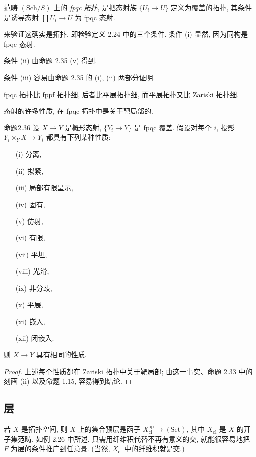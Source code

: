 范畴 $(\mathrm{Sch}/S)$ 上的 \emph{fpqc 拓扑}, 是把态射族 $\{U_i\to U\}$ 定义为覆盖的拓扑, 其条件是诱导态射 $\coprod U_i\to U$ 为 fpqc 态射.

来验证这确实是拓扑, 即检验定义 2.24 中的三个条件. 条件 (i) 显然, 因为同构是 fpqc 态射.

条件 (ii) 由命题 2.35 (v) 得到.

条件 (iii) 容易由命题 2.35 的 (i), (ii) 两部分证明.

fpqc 拓扑比 fppf 拓扑细, 后者比平展拓扑细, 而平展拓扑又比 Zariski 拓扑细.

态射的许多性质, 在 fpqc 拓扑中是关于靶局部的.

\begin{origstatement}{命题}{2.36}\label{ch02:prop236}
设 $X\to Y$ 是概形态射, $\{Y_i\to Y\}$ 是 fpqc 覆盖. 假设对每个 $i$, 投影 $Y_i\times_YX\to Y_i$ 都具有下列某种性质:
\begin{enumerate}
\item[(i)] 分离,
\item[(ii)] 拟紧,
\item[(iii)] 局部有限呈示,
\item[(iv)] 固有,
\item[(v)] 仿射,
\item[(vi)] 有限,
\item[(vii)] 平坦,
\item[(viii)] 光滑,
\item[(ix)] 非分歧,
\item[(x)] 平展,
\item[(xi)] 嵌入,
\item[(xii)] 闭嵌入.
\end{enumerate}
则 $X\to Y$ 具有相同的性质.
\end{origstatement}
\begin{proof}
上述每个性质都在 Zariski 拓扑中关于靶局部; 由这一事实、命题 2.33 中的刻画 (ii) 以及命题 1.15, 容易得到结论.
\end{proof}

\subsection{层}\label{ch02:sec233}
若 $X$ 是拓扑空间, 则 $X$ 上的集合预层是函子 $X_{\mathrm{cl}}^{\mathrm{op}}\to(\mathrm{Set})$, 其中 $X_{\mathrm{cl}}$ 是 $X$ 的开子集范畴, 如例 2.26 中所述. 只需用纤维积代替不再有意义的交, 就能很容易地把 $F$ 为层的条件推广到任意景. (当然, $X_{\mathrm{cl}}$ 中的纤维积就是交.)

